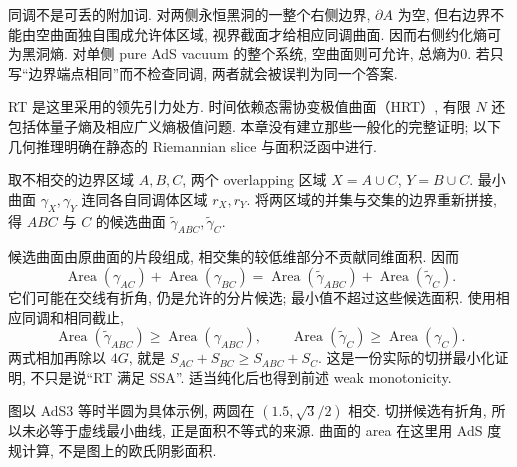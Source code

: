 同调不是可丢的附加词. 对两侧永恒黑洞的一整个右侧边界, $\partial A$ 为空, 但右边界不能由空曲面独自围成允许体区域, 视界截面才给相应同调曲面. 因而右侧约化熵可为黑洞熵. 对单侧 pure AdS vacuum 的整个系统, 空曲面则可允许, 总熵为0. 若只写“边界端点相同”而不检查同调, 两者就会被误判为同一个答案.

RT 是这里采用的领先引力处方. 时间依赖态需协变极值曲面（HRT）, 有限 $N$ 还包括体量子熵及相应广义熵极值问题. 本章没有建立那些一般化的完整证明; 以下几何推理明确在静态的 Riemannian slice 与面积泛函中进行.

取不相交的边界区域 $A,B,C$, 两个 overlapping 区域 $X=A\cup C$, $Y=B\cup C$. 最小曲面 $\gamma_X,\gamma_Y$ 连同各自同调体区域 $r_X,r_Y$. 将两区域的并集与交集的边界重新拼接, 得 $ABC$ 与 $C$ 的候选曲面 $\widetilde\gamma_{ABC},\widetilde\gamma_C$.

候选曲面由原曲面的片段组成, 相交集的较低维部分不贡献同维面积. 因而
\[
\operatorname{Area}(\gamma_{AC})+\operatorname{Area}(\gamma_{BC})
=\operatorname{Area}(\widetilde\gamma_{ABC})+
\operatorname{Area}(\widetilde\gamma_C).
\]
它们可能在交线有折角, 仍是允许的分片候选; 最小值不超过这些候选面积. 使用相应同调和相同截止,
\[
\operatorname{Area}(\widetilde\gamma_{ABC})\ge\operatorname{Area}(\gamma_{ABC}),
\qquad\operatorname{Area}(\widetilde\gamma_C)\ge\operatorname{Area}(\gamma_C).
\]
两式相加再除以 $4G$, 就是 $S_{AC}+S_{BC}\ge S_{ABC}+S_C$. 这是一份实际的切拼最小化证明, 不只是说“RT 满足 SSA”. 适当纯化后也得到前述 weak monotonicity.

\begin{center}
\end{center}
图以 AdS3 等时半圆为具体示例, 两圆在 $(1.5,\sqrt3/2)$ 相交. 切拼候选有折角, 所以未必等于虚线最小曲线, 正是面积不等式的来源. 曲面的 area 在这里用 AdS 度规计算, 不是图上的欧氏阴影面积.

